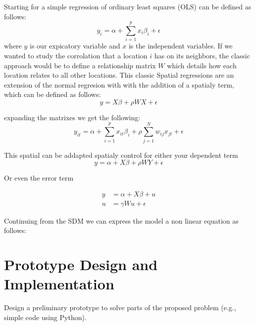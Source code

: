 \documentclass{article}
\begin{document}
Starting for a simple regression of ordinary least squares (OLS) can be defined as follows:
\begin{equation}
  y_i = \alpha + \sum^p_{i=1} x_i \beta_i + \epsilon
  \label{eq:OLS}
\end{equation}
where $y$ is our expicatory variable and $x$ is the independent variables. If we wanted to study the corrolation that a location $i$ has on its neighbors, the classic approach would be 
to define a relationship matrix $W$ which details how each location relates to all other locations. This classic Spatial regressions are an extension of the normal regresion with with 
the addition of a spatialy term, which can be defined as follows:
\begin{equation}
	y = X \beta + \rho W X + \epsilon
	\label{eq:SDM}
\end{equation}

expanding the matrixes we get the following:
\begin{equation}
  y_{it} = \alpha + \sum^p_{i=1} x_{it} \beta_i + \rho \sum^N_{j=1} w_{ij} x_{jt} +\epsilon
  \label{eq:SDM_exp}
\end{equation}

This spatial can be addapted spatialy control for either your dependent term
\begin{equation}
	y = \alpha + X \beta + \rho W Y + \epsilon
	\label{eq:SAR}
\end{equation}

Or even the error term

\begin{equation}
	\begin{split}
		y & =\alpha + X \beta + u  \\
		u & =\gamma W u + \epsilon
	\end{split} 
	\label{eq:SEM}
\end{equation}

Continuing from the SDM we can express the model a non linear equation as follows:


\section{Prototype Design and Implementation}
Design a preliminary prototype to solve parts of the proposed problem (e.g., simple code using Python).
\end{document}
